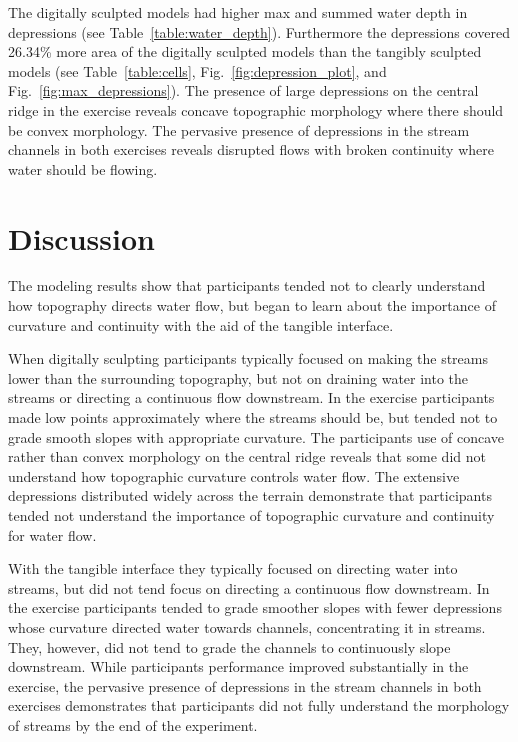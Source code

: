\documentclass{isprs}
\begin{document}
The digitally sculpted models had higher max and summed 
water depth in depressions (see Table~\ref{table:water_depth}).
%
Furthermore the depressions covered 26.34\% more area of the digitally sculpted models than the tangibly sculpted models (see Table~\ref{table:cells}, Fig.~\ref{fig:depression_plot}, and Fig.~\ref{fig:max_depressions}).
%
The presence of large depressions on the central ridge in the  exercise reveals 
concave topographic morphology where there should be convex morphology.
%
The pervasive presence of depressions in the stream channels in both exercises 
reveals disrupted flows with broken continuity where water should be flowing. 

\section{Discussion}\label{sec:discussion}
%
The modeling results show that participants tended not to clearly understand how 
topography directs water flow, but began to learn about the importance of curvature and continuity with the aid of the tangible interface. 

When digitally sculpting 
participants typically focused on making the streams lower than the surrounding topography, 
but not on draining water into the streams or 
directing a continuous flow downstream.
%
In the  exercise participants made low points approximately where the streams should be,
but tended not to grade smooth slopes with appropriate curvature. 
%
The participants use of concave rather than convex morphology on the central ridge reveals that some did not understand how topographic curvature controls water flow.
%
The extensive depressions distributed widely across the terrain
demonstrate that participants tended not understand the importance of topographic curvature and continuity for water flow. 

With the tangible interface they typically focused on directing water into streams,
but did not tend focus on directing a continuous flow downstream.
%
In the  exercise participants tended to grade 
smoother slopes with fewer depressions whose curvature directed water towards channels, concentrating it in streams. They, however, did not tend to grade the channels to continuously slope downstream. 
%
While participants performance improved substantially in the  exercise, 
the pervasive presence of depressions in the stream channels
in both exercises demonstrates that participants did not fully understand the morphology of streams by the end of the experiment. 
\end{document}
